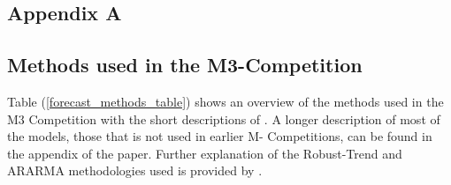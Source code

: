 \documentclass[12pt,a4paper]{article}
\begin{document}
\newpage
\printbibliography{}

\newpage
\begin{center}
\item  \section*{Appendix A} \label{appendix_a}
\end{center}


\begin{center}
  \item  \subsection*{Methods used in the M3-Competition}
\end{center}

Table (\ref{forecast_methods_table}) shows an overview of the methods used in the M3 Competition with the short descriptions of \cite{MAKRIDAKIS2000}. A longer description of most of the models, those that is not used in earlier M- Competitions, can be found in the appendix of the paper. Further explanation of the Robust-Trend and ARARMA methodologies used is provided by \cite{Meade2000}.
\end{document}
